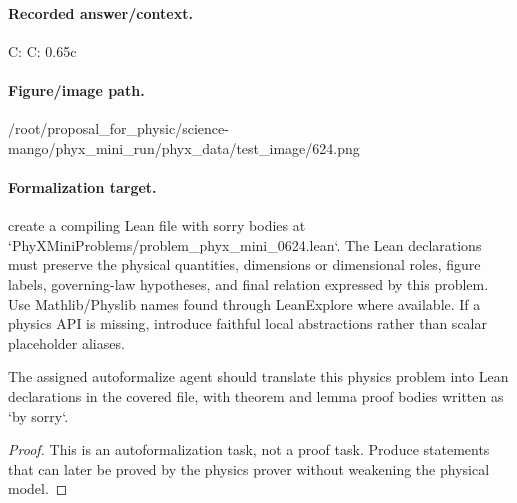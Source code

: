 \paragraph{Recorded answer/context.}
C: C: 0.65c

\paragraph{Figure/image path.}
/root/proposal\_for\_physic/science-mango/phyx\_mini\_run/phyx\_data/test\_image/624.png

\paragraph{Formalization target.}
create a compiling Lean file with sorry bodies at `PhyXMiniProblems/problem\_phyx\_mini\_0624.lean`. The Lean declarations must preserve the physical quantities, dimensions or dimensional roles, figure labels, governing-law hypotheses, and final relation expressed by this problem.
Use Mathlib/Physlib names found through LeanExplore where available. If a physics API is missing, introduce faithful local abstractions rather than scalar placeholder aliases.

\begin{theorem}
\label{thm:physics:phyx_mini_0624:target}
The assigned autoformalize agent should translate this physics problem into Lean declarations in the covered file, with theorem and lemma proof bodies written as `by sorry`.
\end{theorem}
\begin{proof}
This is an autoformalization task, not a proof task. Produce statements that can later be proved by the physics prover without weakening the physical model.
\end{proof}

